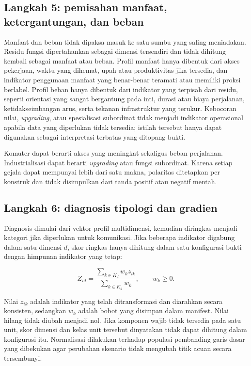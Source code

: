 \documentclass[11pt,a4paper,oneside,openany,indonesian]{report}
\begin{document}
\subsection{Langkah 5: pemisahan manfaat, ketergantungan, dan
beban}\label{langkah-5-pemisahan-manfaat-ketergantungan-dan-beban}

Manfaat dan beban tidak dipaksa masuk ke satu sumbu yang saling
meniadakan. Residu fungsi dipertahankan sebagai dimensi tersendiri dan
tidak dihitung kembali sebagai manfaat atau beban. Profil manfaat hanya
dibentuk dari akses pekerjaan, waktu yang dihemat, upah atau
produktivitas jika tersedia, dan indikator penggunaan manfaat yang
benar-benar teramati atau memiliki proksi berlabel. Profil beban hanya
dibentuk dari indikator yang terpisah dari residu, seperti orientasi
yang sangat bergantung pada inti, durasi atau biaya perjalanan,
ketidakseimbangan arus, serta tekanan infrastruktur yang terukur.
Kebocoran nilai, \emph{upgrading}, atau spesialisasi subordinat tidak
menjadi indikator operasional apabila data yang diperlukan tidak
tersedia; istilah tersebut hanya dapat digunakan sebagai interpretasi
terbatas yang ditopang bukti.

Komuter dapat berarti akses yang meningkat sekaligus beban perjalanan.
Industrialisasi dapat berarti \emph{upgrading} atau fungsi subordinat.
Karena setiap gejala dapat mempunyai lebih dari satu makna, polaritas
ditetapkan per konstruk dan tidak disimpulkan
dari tanda positif atau negatif mentah.

\subsection{Langkah 6: diagnosis tipologi dan
gradien}\label{langkah-6-diagnosis-tipologi-dan-gradien}

Diagnosis dimulai dari vektor profil multidimensi, kemudian diringkas
menjadi kategori jika diperlukan untuk komunikasi. Jika beberapa
indikator digabung dalam satu dimensi \(d\), skor ringkas hanya dihitung
dalam satu konfigurasi bukti dengan himpunan indikator yang tetap:

\[
Z_{id}=\frac{\sum_{k \in K_d} w_k z_{ik}}{\sum_{k \in K_d} w_k}, \qquad w_k \geq 0.
\]

Nilai \(z_{ik}\) adalah indikator yang telah ditransformasi dan
diarahkan secara konsisten, sedangkan \(w_k\) adalah bobot yang disimpan
dalam manifest. Nilai hilang tidak diubah menjadi nol. Jika komponen
wajib tidak tersedia pada satu unit, skor dimensi dan kelas unit
tersebut dinyatakan tidak dapat dihitung dalam konfigurasi itu.
Normalisasi dilakukan terhadap populasi pembanding garis dasar yang
dibekukan agar perubahan skenario tidak mengubah titik acuan secara
tersembunyi.
\end{document}
